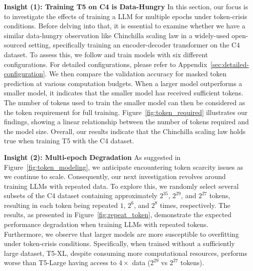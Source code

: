 \documentclass{article}
\begin{document}
\textbf{Insight (1): Training T5 on C4 is Data-Hungry} In this section, our focus is to investigate the effects of training a LLM for multiple epochs under token-crisis conditions. Before delving into that, it is essential to examine whether we have a similar data-hungry observation like Chinchilla scaling law in a widely-used open-sourced setting, specifically training an encoder-decoder transformer on the C4 dataset. 
To assess this, we follow \citep{hoffmann2022training} and train models with six different configurations. For detailed configurations, please refer to Appendix~\ref{sec:detailed-configuration}. We then compare the validation accuracy for masked token prediction at various computation budgets. When a larger model outperforms a smaller model, it indicates that the smaller model has received sufficient tokens. The number of tokens used to train the smaller model can then be considered as the token requirement for full training. Figure~\ref{fig:token_required} illustrates our findings, showing a linear relationship between the number of tokens required and the model size. Overall, our results indicate that the Chinchilla scaling law holds true when training T5 with the C4 dataset.






\textbf{Insight (2): Multi-epoch Degradation} As suggested in Figure~\ref{fig:token_modeling}, we anticipate encountering token scarcity issues as we continue to scale. Consequently, our next investigation revolves around training LLMs with repeated data. To explore this, we randomly select several subsets of the C4 dataset containing approximately $2^{35}$, $2^{29}$, and $2^{27}$ tokens, resulting in each token being repeated $1$, $2^{6}$, and $2^{8}$ times, respectively.
The results, as presented in Figure~\ref{fig:repeat_token}, demonstrate the expected performance degradation when training LLMs with repeated tokens. Furthermore, we observe that larger models are more susceptible to overfitting under token-crisis conditions. Specifically, when trained without a sufficiently large dataset, T5-XL, despite consuming more computational resources, performs worse than T5-Large having access to $4\times$ data ($2^{29}$ vs $2^{27}$ tokens).
\end{document}
